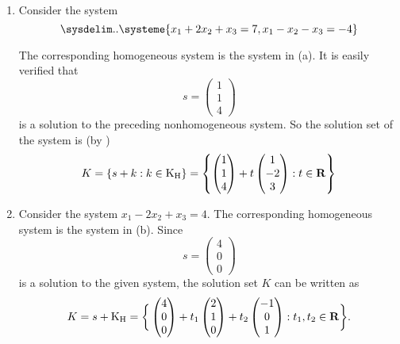 \begin{example} \label{example 3.3.3} \ 

\begin{enumerate}
\item Consider the system
\[
    \sysdelim..\systeme{
        x_1 + 2 x_2 + x_3 = 7,
        x_1 - x_2 - x_3 = -4
    }
\]

The corresponding homogeneous system is the system in (a).
It is easily verified that
\[
    s = \begin{pmatrix} 1 \\ 1 \\ 4 \end{pmatrix}
\]
is a solution to the preceding nonhomogeneous system.
So the solution set of the system is (by )
\[
    K = \left\{ s + k : k \in \mathrm{K_H} \right\}
      = \left\{ \begin{pmatrix} 1 \\ 1 \\ 4 \end{pmatrix}
           + t \begin{pmatrix} 1 \\ -2 \\ 3 \end{pmatrix}
           : t \in \mathbf{R}
        \right\}
\]

\item
Consider the system \(x_1 - 2x_2 + x_3 = 4\).
The corresponding homogeneous system is the system in (b).
Since
\[
    s = \begin{pmatrix} 4 \\ 0 \\ 0 \end{pmatrix}
\]
is a solution to the given system, the solution set \(K\) can be written as
\[
    K = s + \mathrm{K_H}
      = \bigg\{
        \begin{pmatrix} 4 \\ 0 \\ 0 \end{pmatrix}
        + t_1 \begin{pmatrix} 2 \\ 1 \\ 0 \end{pmatrix}
        + t_2 \begin{pmatrix} -1 \\ 0 \\ 1 \end{pmatrix}
        : t_1, t_2 \in \mathbf{R} \bigg\}.
\]
\end{enumerate}
\end{example}

